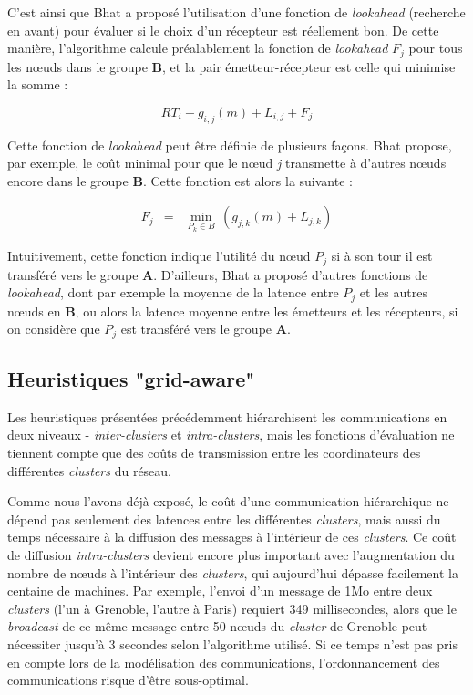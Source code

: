 C'est ainsi que Bhat a proposé l'utilisation d'une fonction de \emph{lookahead}
(recherche en avant) pour évaluer si le choix d'un récepteur est réellement
bon. De cette manière, l'algorithme calcule préalablement la fonction
de \emph{lookahead} $F_{j}$ pour tous les n{\oe}uds dans le groupe
\textbf{B}, et la pair émetteur-récepteur est celle qui minimise
la somme :

\[
RT_{i}+g_{i,j}(m)+L_{i,j}+F_{j}\]


Cette fonction de \emph{lookahead} peut être définie de plusieurs
façons. Bhat \cite{Bhat03} propose, par exemple, le coût minimal
pour que le n{\oe}ud \emph{j} transmette à d'autres n{\oe}uds encore
dans le groupe \textbf{B}. Cette fonction est alors la suivante :

\begin{eqnarray*}
	F_{j} & = & \min_{P_{k}\in B}\,(g_{j,k}(m)+L_{j,k})\end{eqnarray*}


Intuitivement, cette fonction indique l'utilité du n{\oe}ud $P_{j}$
si à son tour il est transféré vers le groupe \textbf{A}. D'ailleurs,
Bhat a proposé d'autres fonctions de \emph{lookahead}, dont par exemple
la moyenne de la latence entre $P_{j}$ et les autres n{\oe}uds en
\textbf{B}, ou alors la latence moyenne entre les émetteurs et les
récepteurs, si on considère que $P_{j}$ est transféré vers le groupe
\textbf{A}. 


\subsection*{Heuristiques "grid-aware"}

Les heuristiques présentées précédemment hiérarchisent les communications en deux niveaux - \emph{inter-clusters}
et \emph{intra-clusters}, mais les fonctions d'évaluation ne tiennent compte que des coûts de transmission entre les coordinateurs
des différentes  \textit{clusters} du réseau.

Comme nous l'avons déjà exposé, le coût d'une communication
hiérarchique ne dépend pas seulement des latences entre les différentes
 \textit{clusters}, mais aussi du temps nécessaire à la diffusion des messages
à l'intérieur de ces  \textit{clusters}. Ce coût de diffusion \textit{intra-clusters} devient
encore plus important avec l'augmentation du nombre de n{\oe}uds à l'intérieur
des  \textit{clusters}, qui aujourd'hui dépasse facilement la centaine de machines.
Par exemple, l'envoi d'un message de 1Mo entre deux \textit{clusters} (l'un à Grenoble, l'autre à Paris) requiert 349 millisecondes, alors que
le \textit{broadcast} de ce même message entre 50 n{\oe}uds du \textit{cluster} de Grenoble
peut nécessiter jusqu'à 3 secondes selon l'algorithme
utilisé. Si ce temps n'est pas pris en compte lors de la modélisation
des communications, l'ordonnancement des communications risque d'être
sous-optimal.

